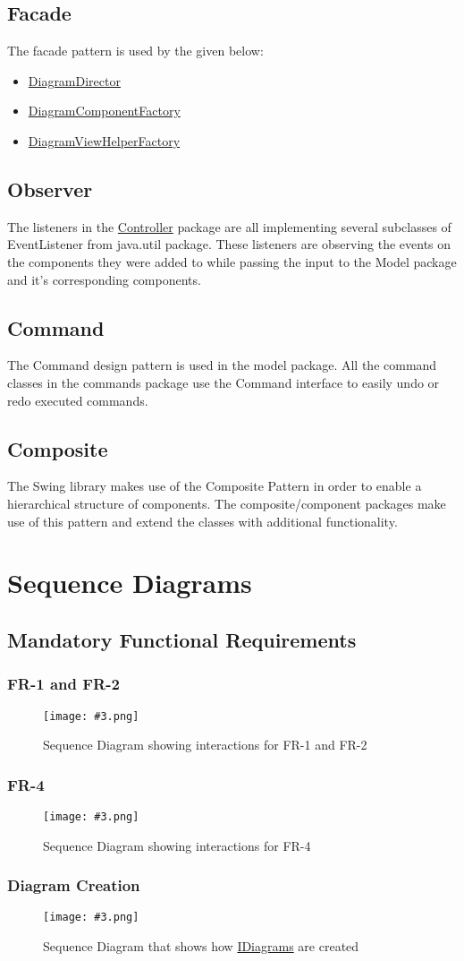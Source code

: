 \documentclass[10pt,a4paper]{report}
\newcommand{\refer}[2]{\hyperref[#1]{\textcolor{col:reference}{#2}}}
\newcommand{\includeimage}[5]{
    \begin{figure}[H]
        #1
        \texttt{[image: \#3.png]}
        \caption{#4}
        \label{fig:#5}
    \end{figure}
}
\newcommand{\type}[1]{\textcolor{col:class}{#1}}
\newcommand{\packagebeginning}{edu.kit.informatik.pse.gelf} %
\newcommand{\lblroot}{lbl} %
\newcommand{\lblpackage}{} %
\newcommand{\lblpackageelement}{} %
\newcommand{\lblpackageelementmember}{} %
\newcommand{\lblpackageelementmemberparameter}{} %
\newcommand{\casclabelname}{\lblroot\lblpackage\lblpackageelement\lblpackageelementmember\lblpackageelementmemberparameter}
\newcommand{\casclabel}{\label{\casclabelname}}
\newcommand{\patternentry}[2]{
    #1{#2}
}
\newcommand{\pattern}[2]{
    \patternentry{\section}{#1}
    {#2}
}
\begin{document}
\pattern{Facade}{
    The facade pattern is used by the given below:
    \leavevmode \\
    \begin{itemize}
        \item \refer{\lblroot:view.diagrams:DiagramDirector}{DiagramDirector}
        \item \refer{\lblroot:view.diagrams.components:DiagramComponentFactory}{DiagramComponentFactory}
        \item \refer{\lblroot:view.diagrams.indicator:DiagramViewHelperFactory}{DiagramViewHelperFactory}
    \end{itemize}
}
\pattern{Observer}{The listeners in the \refer{\lblroot:controller.listeners}{Controller} package are all implementing several subclasses of \type{EventListener} from java.util package. These listeners are observing the events on the components they were added to while passing the input to the Model package and it's corresponding components.}
\pattern{Command}
{The Command design pattern is used in the model package.\newline
All the command classes in the commands package use the Command interface to easily undo or redo executed commands.}
\pattern{Composite}{
    The Swing library makes use of the Composite Pattern in order to enable a hierarchical structure of components. The composite/component packages make use of this pattern and extend the classes with additional functionality.
}

\chapter{Sequence Diagrams}
\section{Mandatory Functional Requirements}
\subsection{FR-1 and FR-2}
\includeimage{}{0.23}{FR1-2}{Sequence Diagram showing interactions for FR-1 and FR-2}{FR-1 and FR-2}
\subsection{FR-4}
\includeimage{}{0.25}{FR-4}{Sequence Diagram showing interactions for FR-4}{FR-4}
\subsection{Diagram Creation}
\includeimage{}{0.32}{DiagramCreation}{Sequence Diagram that shows how \refer{\lblroot:view.diagrams:IDiagram}{IDiagrams} are created}{Diagram Creation}
\end{document}
